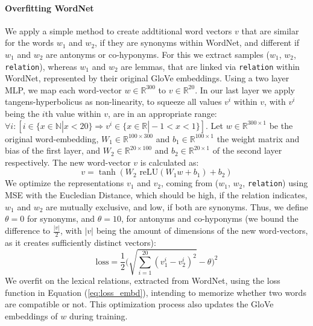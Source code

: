 \paragraph*{Overfitting WordNet}
We apply a simple method to create addtitional word vectors $v$ that are similar for the words $w_1$ and $w_2$, if they are synonyms within WordNet, and different if $w_1$ and $w_2$ are antonyms or co-hyponyms. For this we extract samples ($w_1$, $w_2$, \texttt{relation}), whereas $w_1$ and $w_2$ are lemmas, that are linked via \texttt{relation} within WordNet, represented by their original GloVe embeddings. Using a two layer \ac{MLP}, we map each word-vector $w \in \mathbb{R}^{300}$ to $v \in \mathbb{R}^{20}$. In our last layer we apply tangens-hyperbolicus as non-linearity, to squeeze all values $v^i$ within $v$, with $v^i$ being the $i$th value within $v$, are in an appropriate range:  $ \forall i: [i \in \{x \in \mathbb{N} | x < 20\} \Rightarrow v^i \in \{x \in \mathbb{R} | -1 < x < 1\}]$. Let $w \in \mathbb{R}^{300 \times 1}$ be the original word-embedding, $W_1 \in \mathbb{R}^{100 \times 300}$ and $b_1 \in \mathbb{R}^{100 \times 1}$ the weight matrix and bias of the first layer, and $W_2 \in \mathbb{R}^{20 \times 100}$ and $b_2 \in \mathbb{R}^{20 \times 1}$ of the second layer respectively. The new word-vector $v$ is calculated as:
\begin{equation}
v = \tanh(W_2 \text{ reLU}(W_1w + b_1) + b_2)
\end{equation}
We optimize the representations $v_1$ and $v_2$, coming from ($w_1$, $w_2$, \texttt{relation}) using \ac{MSE} with the Eucledian Distance, which should be high, if the relation indicates, $w_1$ and $w_2$ are mutually exclusive, and low, if both are synonyms. Thus, we define $\theta=0$ for synonyms, and $\theta =10$, for antonyms and co-hyponyms (we bound the difference to $\frac{|v|}{2}$, with $|v|$ being the amount of dimensions of the new word-vectors, as it creates sufficiently distinct vectors):
\begin{equation}\label{eq:loss_embd}
\text{loss} = \frac{1}{2}\Bigg( \sqrt{\sum^{20}_{i=1}(v^i_1 - v^i_2)^2} - \theta\Bigg)^2
\end{equation}
We overfit on the lexical relations, extracted from WordNet, using the loss function in Equation (\ref{eq:loss_embd}), intending to memorize whether two words are compatible or not. This optimization process also updates the GloVe embeddings of $w$ during training.
